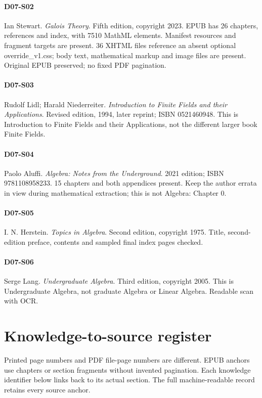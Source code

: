 \paragraph{D07-S02}
Ian Stewart. \emph{Galois Theory}. Fifth edition, copyright 2023. EPUB has 26 chapters, references and index, with 7510 MathML elements. Manifest resources and fragment targets are present. 36 XHTML files reference an absent optional override\_v1.css; body text, mathematical markup and image files are present. Original EPUB preserved; no fixed PDF pagination.
\paragraph{D07-S03}
Rudolf Lidl; Harald Niederreiter. \emph{Introduction to Finite Fields and their Applications}. Revised edition, 1994, later reprint; ISBN 0521460948. This is Introduction to Finite Fields and their Applications, not the different larger book Finite Fields.
\paragraph{D07-S04}
Paolo Aluffi. \emph{Algebra: Notes from the Underground}. 2021 edition; ISBN 9781108958233. 15 chapters and both appendices present. Keep the author errata in view during mathematical extraction; this is not Algebra: Chapter 0.
\paragraph{D07-S05}
I. N. Herstein. \emph{Topics in Algebra}. Second edition, copyright 1975. Title, second-edition preface, contents and sampled final index pages checked.
\paragraph{D07-S06}
Serge Lang. \emph{Undergraduate Algebra}. Third edition, copyright 2005. This is Undergraduate Algebra, not graduate Algebra or Linear Algebra. Readable scan with OCR.
\section{Knowledge-to-source register}
Printed page numbers and PDF file-page numbers are different. EPUB anchors use chapters or section fragments without invented pagination.
Each knowledge identifier below links back to its actual section. The full machine-readable record retains every source anchor.
